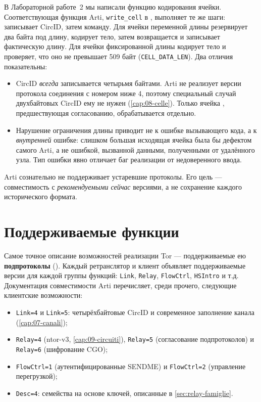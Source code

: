 В Лабораторной работе~2 мы написали функцию кодирования ячейки. Соответствующая функция Arti, \texttt{write\_cell} в , выполняет те же шаги: записывает CircID, затем команду. Для ячейки переменной длины резервирует два байта под длину, кодирует тело, затем возвращается и записывает фактическую длину. Для ячейки фиксированной длины кодирует тело и проверяет, что оно не превышает 509 байт (\texttt{CELL\_DATA\_LEN}). Два отличия показательны:
\begin{itemize}
  \item CircID \emph{всегда} записывается четырьмя байтами. Arti не реализует версии протокола соединения с номером ниже 4, поэтому специальный случай двухбайтовых CircID ему не нужен (\cref{cap:08-celle}). Только ячейка , предшествующая согласованию, обрабатывается отдельно.
  \item Нарушение ограничения длины приводит не к ошибке вызывающего кода, а к \emph{внутренней} ошибке: слишком большая исходящая ячейка была бы дефектом самого Arti, а не ошибкой, вызванной данными, полученными от удалённого узла. Тип ошибки явно отличает баг реализации от недоверенного ввода.
\end{itemize}
Arti сознательно не поддерживает устаревшие протоколы. Его цель — совместимость с \emph{рекомендуемыми сейчас} версиями, а не сохранение каждого исторического формата.

\section{Поддерживаемые функции}\label{sec:arti-supporto}

Самое точное описание возможностей реализации Tor — поддерживаемые ею \textbf{подпротоколы} (). Каждый ретранслятор и клиент объявляет поддерживаемые версии для каждой группы функций: \texttt{Link}, \texttt{Relay}, \texttt{FlowCtrl}, \texttt{HSIntro} и т.д. Документация совместимости Arti перечисляет, среди прочего, следующие клиентские возможности:
\begin{itemize}
  \item \texttt{Link=4} и \texttt{Link=5}: четырёхбайтовые CircID и современное заполнение канала (\cref{cap:07-canali});
  \item \texttt{Relay=4} (ntor-v3, \cref{cap:09-circuiti}), \texttt{Relay=5} (согласование подпротоколов) и \texttt{Relay=6} (шифрование CGO);
  \item \texttt{FlowCtrl=1} (аутентифицированные SENDME) и \texttt{FlowCtrl=2} (управление перегрузкой);
  \item \texttt{Desc=4}: семейства на основе ключей, описанные в \cref{sec:relay-famiglie}.
\end{itemize}

